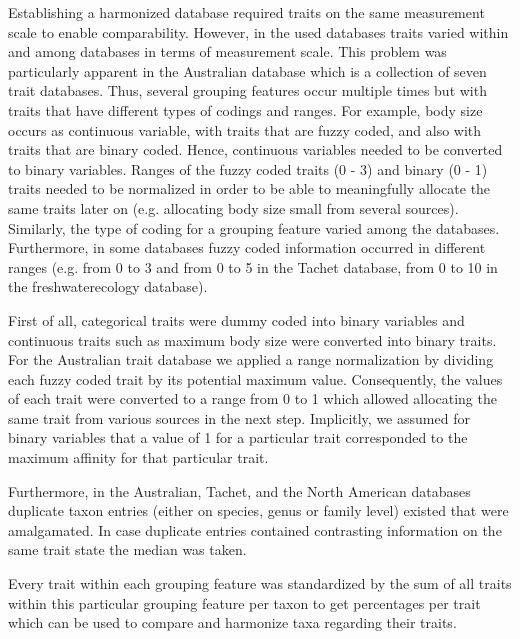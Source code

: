 \documentclass{article}
\begin{document}
Establishing a harmonized database required traits on the same measurement scale to 
enable comparability. However, in the used databases traits varied within and among databases 
in terms of measurement scale. 
This problem was particularly apparent in the Australian database which is a collection 
of seven trait databases. Thus, several grouping features occur multiple times but with 
traits that have different types of codings and ranges. 
For example, body size occurs as continuous variable, with traits that are fuzzy coded,
and also with traits that are binary coded. Hence, continuous variables needed to be converted to 
binary variables. Ranges of the fuzzy coded traits (0 - 3) and binary (0 - 1) traits needed to be 
normalized in order to be able to meaningfully allocate the same traits later on 
(e.g. allocating body size small from several sources).
Similarly, the type of coding for a grouping feature varied among the databases. %
Furthermore, in some databases fuzzy coded information occurred in different ranges 
(e.g. from 0 to 3 and from 0 to 5 in the Tachet database, from 0 to 10 in the 
freshwaterecology database). 

First of all, categorical traits were dummy coded into binary variables and continuous
traits such as maximum body size were converted into binary traits. 
For the Australian trait database we applied a range normalization by dividing each fuzzy
coded trait by its potential maximum value. Consequently, the values of each trait
were converted to a range from 0 to 1 which allowed allocating the same trait from various
sources in the next step. Implicitly, we assumed for binary variables that a value of 1 
for a particular trait corresponded to the maximum affinity for that particular trait. 

Furthermore, in the Australian, Tachet, and the North American databases duplicate taxon entries 
(either on species, genus or family level) existed that were amalgamated. 
In case duplicate entries contained contrasting information on the same trait state the median 
was taken. %

Every trait within each grouping feature was standardized by the sum of all traits within 
this particular grouping feature per taxon to get percentages per trait which can be used to 
compare and harmonize taxa regarding their traits. %
\end{document}
